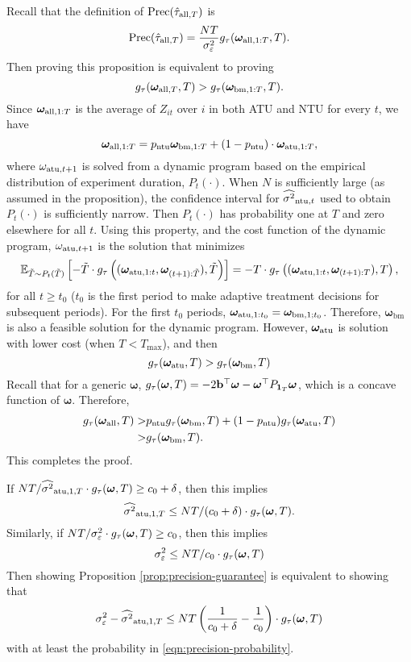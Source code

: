 Recall that the definition of $\mathrm{Prec}(\hat{\tau}_{\mathrm{all},T})$ is 
\[\mathrm{Prec}(\hat{\tau}_{\mathrm{all},T}) = \frac{N T}{\sigma^2_{\varepsilon}} g_\tau(\bm{\omega}_{\mathrm{all},1:T}, T).  \]
Then proving this proposition is equivalent to proving 
\[g_\tau(\bm{\omega}_{\mathrm{all},T}, T) > g_\tau(\bm{\omega}_{\mathrm{bm},1:T}, T). \]
Since $\bm{\omega}_{\mathrm{all},1:T}$ is the average of $Z_{it}$ over $i$ in both ATU and NTU for every $t$, we have  
\[\bm{\omega}_{\mathrm{all},1:T} = p_{\mathrm{ntu}} \bm{\omega}_{\mathrm{bm},1:T}  + (1- p_{\mathrm{ntu}}) \cdot \bm{\omega}_{\mathrm{atu},1:T},  \]
where $\omega_{\mathrm{atu},t+1}$ is solved from a dynamic program based on the empirical distribution of experiment duration, $P_t(\cdot)$. When $N$ is sufficiently large (as assumed in the proposition), the confidence interval for $\widehat{\sigma^2}_{\mathrm{ntu},t}$ used to obtain  $P_t(\cdot)$ is sufficiently narrow. Then $P_t(\cdot)$ has probability one at $T$ and zero elsewhere for all $t$. Using this property, and the cost function of the dynamic program, $\omega_{\mathrm{atu},t+1}$ is the solution that minimizes
\[
\mathbb{E}_{\tilde{T} \sim P_t(\tilde{T})} \left[ - 
\tilde{T} \cdot g_\tau\left((\bm{\omega}_{\mathrm{atu},1:t}, \bm{\omega}_{(t+1):\tilde{T}}), \tilde{T}\right) \right] = - T \cdot g_\tau\left((\bm{\omega}_{\mathrm{atu},1:t}, \bm{\omega}_{(t+1):T}), T\right),  \]
for all $t \geq t_0$ ($t_0$ is the first period to make adaptive treatment decisions for subsequent periods). For the first $t_0$ periods, $\bm{\omega}_{\mathrm{atu},1:t_0} = \bm{\omega}_{\mathrm{bm}, 1;t_0}$. Therefore, $\bm{\omega}_{\mathrm{bm}}$ is also a feasible solution for the dynamic program. However, $\bm{\omega}_{\mathrm{atu}}$ is solution with lower cost (when $T < T_{\max}$), and then
\[g_\tau(\bm{\omega}_{\mathrm{atu}}, T) > g_\tau(\bm{\omega}_{\mathrm{bm}}, T) \]
Recall that for a generic $\bm{\omega}$, $g_\tau(\bm{\omega}, T) = - 2 \mathbf{b}^\top \bm{\omega} - \bm{\omega}^\top P_{\bm{1}_T} \bm{\omega}$, which is a concave function of $\bm{\omega}$. Therefore, 
\begin{align*}
    g_\tau(\bm{\omega}_{\mathrm{all}}, T) >& p_{\mathrm{ntu}} g_\tau(\bm{\omega}_{\mathrm{bm}}, T) + (1-p_{\mathrm{ntu}}) g_\tau(\bm{\omega}_{\mathrm{atu}}, T) \\ >& g_\tau(\bm{\omega}_{\mathrm{bm}}, T).
\end{align*}
This completes the proof. \halmos

If 
$NT/\widehat{\sigma^2}_{\mathrm{atu},1,T} \cdot g_\tau(\bm{\omega}, T) \geq c_0 + \delta$, then this implies 
\[\widehat{\sigma^2}_{\mathrm{atu},1,T} \leq NT/(c_0 + \delta) \cdot g_\tau(\bm{\omega}, T).   \]
Similarly, if $NT/\sigma_\varepsilon^2 \cdot g_\tau(\bm{\omega}, T) \geq c_0 $, then this implies 
\[ \sigma_\varepsilon^2 \leq NT/c_0 \cdot g_\tau(\bm{\omega}, T) \]
Then showing Proposition \ref{prop:precision-guarantee} is equivalent to showing that 
\[\sigma_\varepsilon^2 - \widehat{\sigma^2}_{\mathrm{atu},1,T} \leq NT\left(\frac{1}{c_0 + \delta} - \frac{1}{c_0}  \right)\cdot g_\tau(\bm{\omega}, T) \]
with at least the probability in \ref{eqn:precision-probability}.

